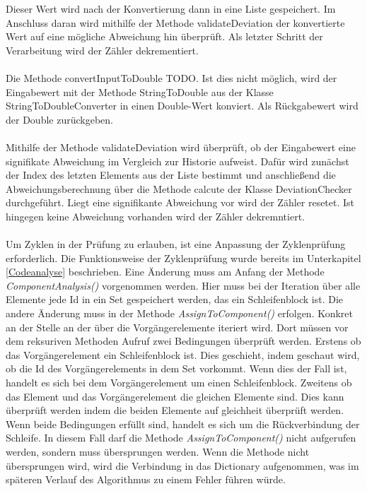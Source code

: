 \documentclass{article}
\begin{document}
    Dieser Wert wird nach der Konvertierung dann in eine Liste gespeichert.
    Im Anschluss daran wird mithilfe der Methode validateDeviation der konvertierte Wert auf eine mögliche Abweichung hin überprüft.
    Als letzter Schritt der Verarbeitung wird der Zähler dekrementiert.\\
    \\
    Die Methode convertInputToDouble TODO. Ist dies nicht möglich, wird der Eingabewert mit der Methode StringToDouble aus der Klasse StringToDoubleConverter in einen Double-Wert konviert.
    Als Rückgabewert wird der Double zurückgeben.\\
    \\
    Mithilfe der Methode validateDeviation wird überprüft, ob der Eingabewert eine signifikate Abweichung im Vergleich zur Historie aufweist.
    Dafür wird zunächst der Index des letzten Elements aus der Liste bestimmt und anschließend die Abweichungsberechnung über die Methode calcute der Klasse DeviationChecker durchgeführt.
    Liegt eine signifikante Abweichung vor wird der Zähler resetet. Ist hingegen keine Abweichung vorhanden wird der Zähler dekremntiert.\\
    \\
    Um Zyklen in der Prüfung zu erlauben, ist eine Anpassung der Zyklenprüfung erforderlich.
    Die Funktionsweise der Zyklenprüfung wurde bereits im Unterkapitel \ref{Codeanalyse} beschrieben.
    Eine Änderung muss am Anfang der Methode \textit{ComponentAnalysis()} vorgenommen werden.
    Hier muss bei der Iteration über alle Elemente jede Id in ein Set gespeichert werden, das ein Schleifenblock ist.
    Die andere Änderung muss in der Methode \textit{AssignToComponent()} erfolgen.
    Konkret an der Stelle an der über die Vorgängerelemente iteriert wird.
    Dort müssen vor dem reksuriven Methoden Aufruf zwei Bedingungen überprüft werden.
    Erstens ob das Vorgängerelement ein Schleifenblock ist.
    Dies geschieht, indem geschaut wird, ob die Id des Vorgängerelements in dem Set vorkommt. 
    Wenn dies der Fall ist, handelt es sich bei dem Vorgängerelement um einen Schleifenblock.
    Zweitens ob das Element und das Vorgängerelement die gleichen Elemente sind.
    Dies kann überprüft werden indem die beiden Elemente auf gleichheit überprüft werden.
    Wenn beide Bedingungen erfüllt sind, handelt es sich um die Rückverbindung der Schleife. 
    In diesem Fall darf die Methode \textit{AssignToComponent()} nicht aufgerufen werden, sondern muss übersprungen werden.
    Wenn die Methode nicht übersprungen wird, wird die Verbindung in das Dictionary aufgenommen, was im späteren Verlauf des Algorithmus zu einem Fehler führen würde.
\end{document}
